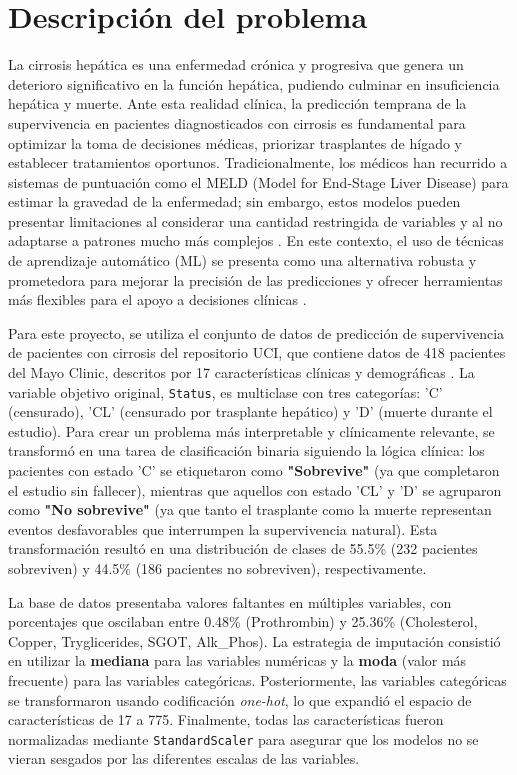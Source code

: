 \documentclass[journal]{IEEEtai}
\begin{document}
\section{Descripción del problema}
La cirrosis hepática es una enfermedad crónica y progresiva que genera un deterioro significativo en la función hepática, pudiendo culminar en insuficiencia hepática y muerte. Ante esta realidad clínica, la predicción temprana de la supervivencia en pacientes diagnosticados con cirrosis es fundamental para optimizar la toma de decisiones médicas, priorizar trasplantes de hígado y establecer tratamientos oportunos. Tradicionalmente, los médicos han recurrido a sistemas de puntuación como el MELD (Model for End-Stage Liver Disease) para estimar la gravedad de la enfermedad; sin embargo, estos modelos pueden presentar limitaciones al considerar una cantidad restringida de variables y al no adaptarse a patrones mucho más complejos \cite{Kamath2007}. En este contexto, el uso de técnicas de aprendizaje automático (ML) se presenta como una alternativa robusta y prometedora para mejorar la precisión de las predicciones y ofrecer herramientas más flexibles para el apoyo a decisiones clínicas \cite{Esteva2019}.

Para este proyecto, se utiliza el conjunto de datos de predicción de supervivencia de pacientes con cirrosis del repositorio UCI, que contiene datos de 418 pacientes del Mayo Clinic, descritos por 17 características clínicas y demográficas \cite{UCI2025}. La variable objetivo original, \texttt{Status}, es multiclase con tres categorías: 'C' (censurado), 'CL' (censurado por trasplante hepático) y 'D' (muerte durante el estudio). Para crear un problema más interpretable y clínicamente relevante, se transformó en una tarea de clasificación binaria siguiendo la lógica clínica: los pacientes con estado 'C' se etiquetaron como \textbf{"Sobrevive"} (ya que completaron el estudio sin fallecer), mientras que aquellos con estado 'CL' y 'D' se agruparon como \textbf{"No sobrevive"} (ya que tanto el trasplante como la muerte representan eventos desfavorables que interrumpen la supervivencia natural). Esta transformación resultó en una distribución de clases de 55.5\% (232 pacientes sobreviven) y 44.5\% (186 pacientes no sobreviven), respectivamente.

La base de datos presentaba valores faltantes en múltiples variables, con porcentajes que oscilaban entre 0.48\% (Prothrombin) y 25.36\% (Cholesterol, Copper, Tryglicerides, SGOT, Alk\_Phos). La estrategia de imputación consistió en utilizar la \textbf{mediana} para las variables numéricas y la \textbf{moda} (valor más frecuente) para las variables categóricas. Posteriormente, las variables categóricas se transformaron usando codificación \textit{one-hot}, lo que expandió el espacio de características de 17 a 775. Finalmente, todas las características fueron normalizadas mediante \texttt{StandardScaler} para asegurar que los modelos no se vieran sesgados por las diferentes escalas de las variables.
\end{document}
